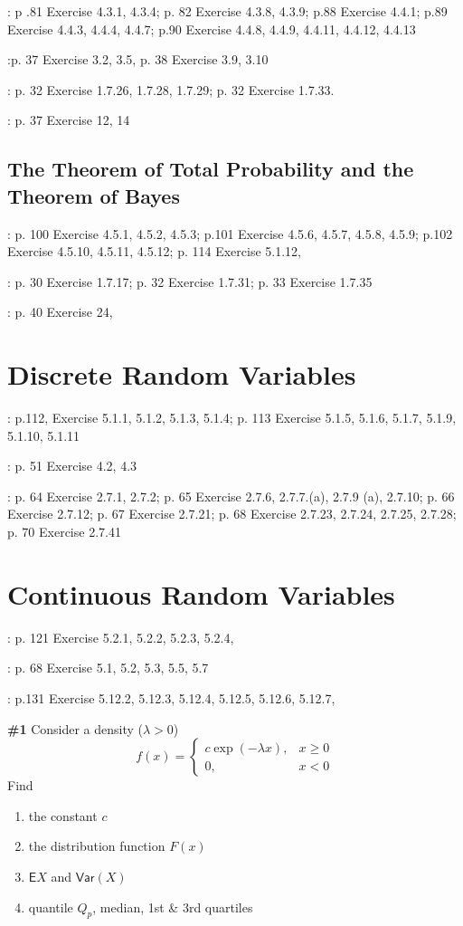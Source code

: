 \documentclass[12pt]{article}
\begin{document}
\cite{Schay}: p .81 Exercise 4.3.1, 4.3.4; p. 82 Exercise 4.3.8, 4.3.9;
p.88 Exercise 4.4.1; p.89 Exercise 4.4.3, 4.4.4, 4.4.7;
p.90 Exercise 4.4.8, 4.4.9, 4.4.11, 4.4.12, 4.4.13

\noindent\cite{Dekking}:p. 37 Exercise 3.2, 3.5, p. 38 Exercise 3.9, 3.10

\noindent\cite{Meester}:  p. 32 Exercise 1.7.26, 1.7.28, 1.7.29; 
p. 32 Exercise 1.7.33.

\noindent\cite{Mittelhammer}: p. 37 Exercise 12, 14

\subsection{The Theorem of Total Probability
and the Theorem of Bayes}

\cite{Schay}: p. 100 Exercise 4.5.1, 4.5.2,  4.5.3; p.101 Exercise 4.5.6, 4.5.7,
4.5.8, 4.5.9; p.102 Exercise 4.5.10, 4.5.11, 4.5.12;
p. 114 Exercise 5.1.12, 

\noindent\cite{Meester}:  p. 30 Exercise 1.7.17; p. 32 Exercise 1.7.31;
p. 33 Exercise 1.7.35

\noindent\cite{Mittelhammer}: p. 40 Exercise 24, 

\section{Discrete Random Variables}

\cite{Schay}: p.112, Exercise 5.1.1, 5.1.2, 5.1.3, 5.1.4; 
p. 113 Exercise 5.1.5, 5.1.6, 5.1.7, 5.1.9, 5.1.10, 5.1.11

\noindent\cite{Dekking}: p. 51 Exercise 4.2, 4.3

\noindent\cite{Meester}: p.  64 Exercise 2.7.1, 2.7.2; 
p. 65 Exercise 2.7.6, 2.7.7.(a), 2.7.9 (a), 2.7.10;
p. 66 Exercise 2.7.12; p. 67 Exercise 2.7.21; 
p. 68 Exercise 2.7.23, 2.7.24, 2.7.25, 2.7.28;
p. 70 Exercise 2.7.41

\section{Continuous Random Variables}

\cite{Schay}: p. 121 Exercise 5.2.1, 5.2.2, 5.2.3, 5.2.4,

\noindent\cite{Dekking}: p. 68 Exercise 5.1, 5.2, 5.3, 5.5, 5.7

\noindent\cite{Meester}:  p.131 Exercise 5.12.2,  5.12.3, 5.12.4, 5.12.5,
5.12.6, 5.12.7,

\noindent\textbf{\#1} Consider a density ($\lambda>0$)
\[
	f(x)=\begin{cases} 
	c\exp(-\lambda x), & x\geq0 \\ 0, & x<0
	\end{cases}
\]
Find
\begin{enumerate}
	\item the constant $c$
	\item the distribution function $F(x)$
	\item $\mathsf{E}X$ and $\mathsf{Var}(X)$
	\item quantile $Q_p$, median, 1st \& 3rd quartiles
\end{enumerate}
\end{document}
